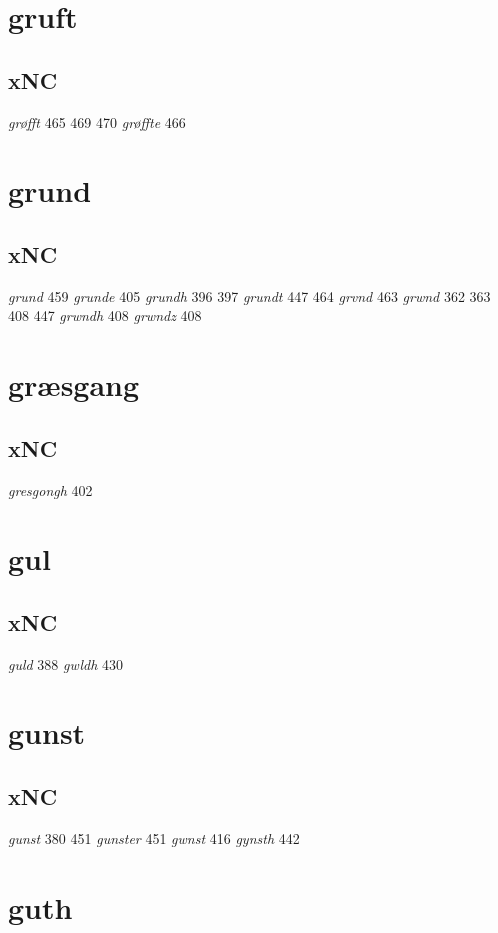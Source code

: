 \documentclass[a4paper,twocolumn]{article}
\begin{document}
\section{gruft}
\label{sec:org4f08329}
\subsection{xNC}
\label{sec:org5fdef7a}
\emph{grøfft} 465 469 470 \emph{grøffte} 466 
\section{grund}
\label{sec:org7cf1b1d}
\subsection{xNC}
\label{sec:org73c5ae4}
\emph{grund} 459 \emph{grunde} 405 \emph{grundh} 396 397 \emph{grundt} 447 464 \emph{grvnd} 463 \emph{grwnd} 362 363 408 447 \emph{grwndh} 408 \emph{grwndz} 408 
\section{græsgang}
\label{sec:orgf88e27c}
\subsection{xNC}
\label{sec:org9b136d3}
\emph{gresgongh} 402 
\section{gul}
\label{sec:org99f4f5f}
\subsection{xNC}
\label{sec:org479e01d}
\emph{guld} 388 \emph{gwldh} 430 
\section{gunst}
\label{sec:org6934053}
\subsection{xNC}
\label{sec:org45b3d19}
\emph{gunst} 380 451 \emph{gunster} 451 \emph{gwnst} 416 \emph{gynsth} 442 
\section{guth}
\label{sec:org84a0bc2}
\end{document}
